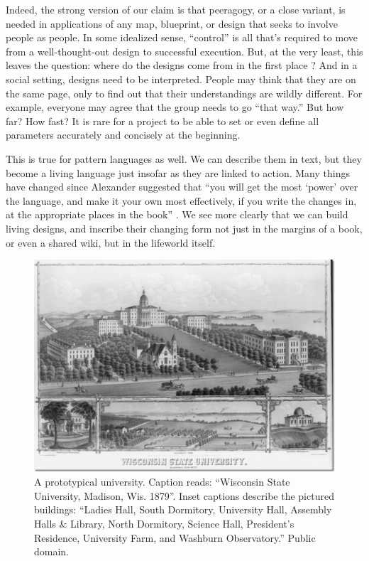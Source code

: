 Indeed, the strong version of our claim is that peeragogy, or a close variant, is needed in applications of any map, blueprint, or design that seeks to involve people as people.  In some idealized sense, ``control'' is all that's required to move from a well-thought-out design to successful execution.  But, at the very least, this leaves the question: where do the designs come from in the first place \cite{von2003cybernetics}?
%
And in a social setting, designs need to be interpreted.  People may think that they are on the same page, only to find out that their understandings are wildly different.  For  example, everyone may agree that the group needs to go ``that way.''  But how far?  How fast?  It is rare for a project to be able to set or even define all parameters accurately and concisely at the beginning.

This is true for pattern languages as well.  We can describe them in text, but they become a living language just insofar as they are linked to action.  Many things have changed since Alexander suggested that ``you will get the most `power' over the language, and make it your own most effectively, if you write the changes in, at the appropriate places in the book'' \cite[p.~xl]{alexander1977pattern}.  We see more clearly that we can build living designs, and inscribe their changing form not just in the margins of a book, or even a shared wiki, but in the lifeworld itself.  

\begin{figure}
\vspace{-.2cm}
\begin{center}
\includegraphics[width=.5\textwidth,trim=0 30 10 2, clip=true]{wisconsin-map}
\end{center}
\vspace{-.1cm}
\caption{A prototypical university.  Caption reads: ``Wisconsin State
  University, Madison, Wis. 1879''.  Inset captions describe the
  pictured buildings: ``Ladies Hall, South Dormitory, University Hall,
  Assembly Halls \& Library, North Dormitory, Science Hall, President's
  Residence, University Farm, and Washburn Observatory.''  Public
  domain.\label{madison-map}}
\vspace{-.3cm}
\end{figure}

